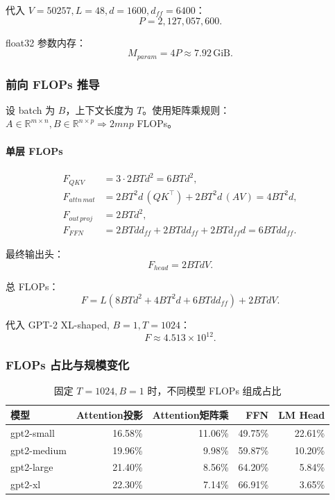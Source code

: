 \documentclass[UTF8,11pt,a4paper]{ctexart}
\begin{document}
代入 \(V=50257, L=48, d=1600, d_{ff}=6400\)：
\[
P = 2{,}127{,}057{,}600.
\]

float32 参数内存：
\[
M_{param} = 4P \approx 7.92\,\text{GiB}.
\]

\subsubsection{前向 FLOPs 推导}

设 batch 为 \(B\)，上下文长度为 \(T\)。使用矩阵乘规则：
\(A\in\mathbb{R}^{m\times n},B\in\mathbb{R}^{n\times p}\Rightarrow 2mnp\) FLOPs。

\paragraph{单层 FLOPs}
\begin{align}
F_{QKV} &= 3\cdot 2BTd^2 = 6BTd^2,\\
F_{attn\,mat} &= 2BT^2d\,(QK^\top) + 2BT^2d\,(AV)=4BT^2d,\\
F_{out\,proj} &= 2BTd^2,\\
F_{FFN} &= 2BTdd_{ff} + 2BTdd_{ff} + 2BTd_{ff}d = 6BTdd_{ff}.
\end{align}

最终输出头：
\[
F_{head}=2BTdV.
\]

总 FLOPs：
\[
F = L(8BTd^2 + 4BT^2d + 6BTdd_{ff}) + 2BTdV.
\]

代入 GPT-2 XL-shaped, \(B=1,T=1024\)：
\[
F\approx 4.513\times 10^{12}.
\]

\subsubsection{FLOPs 占比与规模变化}

\begin{table}[H]
\centering
\caption{固定 \(T=1024,B=1\) 时，不同模型 FLOPs 组成占比}
\begin{tabular}{lrrrr}
\toprule
模型 & Attention投影 & Attention矩阵乘 & FFN & LM Head \\
\midrule
gpt2-small  & 16.58\% & 11.06\% & 49.75\% & 22.61\% \\
gpt2-medium & 19.96\% & 9.98\%  & 59.87\% & 10.20\% \\
gpt2-large  & 21.40\% & 8.56\%  & 64.20\% & 5.84\%  \\
gpt2-xl     & 22.30\% & 7.14\%  & 66.91\% & 3.65\%  \\
\bottomrule
\end{tabular}
\end{table}
\end{document}
